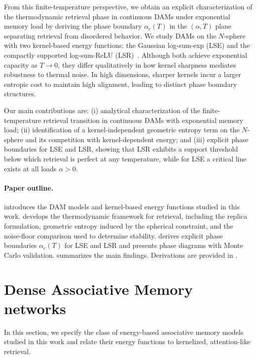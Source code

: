 \documentclass{article}
\theoremstyle{plain}
\theoremstyle{definition}
\theoremstyle{remark}
\begin{document}
From this finite-temperature perspective, we obtain an explicit characterization of the thermodynamic retrieval phase in continuous DAMs under exponential memory load by deriving the phase boundary $\alpha_c(T)$ in the $(\alpha,T)$ plane separating retrieval from disordered behavior. We study DAMs on the $N$-sphere with two kernel-based energy functions: the Gaussian log-sum-exp (LSE) and the compactly supported log-sum-ReLU (LSR)~\citep{hoover2025dense}. Although both achieve exponential capacity as $T \to 0$, they differ qualitatively in how kernel sharpness mediates robustness to thermal noise. In high dimensions, sharper kernels incur a larger entropic cost to maintain high alignment, leading to distinct phase boundary structures.

Our main contributions are: (i) analytical characterization of the finite-temperature retrieval transition in continuous DAMs with exponential memory load; (ii) identification of a kernel-independent geometric entropy term on the $N$-sphere and its competition with kernel-dependent energy; and (iii) explicit phase boundaries for LSE and LSR, showing that LSR exhibits a support threshold below which retrieval is perfect at any temperature, while for LSE a critical line exists at all loads $\alpha > 0$.

\paragraph{Paper outline.}
 introduces the DAM models and kernel-based energy functions studied in this work. 
 develops the thermodynamic framework for retrieval, including the replica formulation, geometric entropy induced by the spherical constraint, and the noise-floor comparison used to determine stability. 
 derives explicit phase boundaries $\alpha_c(T)$ for LSE and LSR and presents phase diagrams with Monte Carlo validation. 
 summarizes the main findings. 
Derivations are provided in .




\section{Dense Associative Memory networks}\label{sec:dam}

In this section, we specify the class of energy-based associative memory models studied in this work and relate their energy functions to kernelized, attention-like retrieval.
\end{document}
